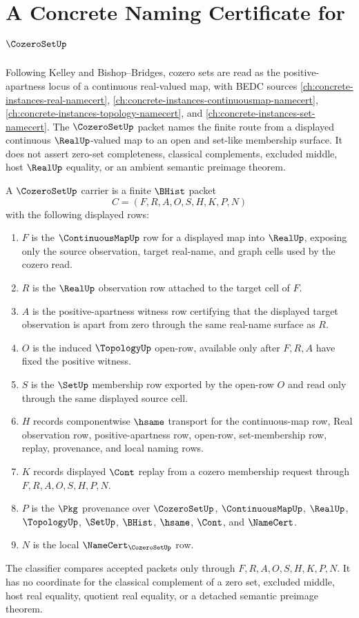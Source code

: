 \chapter{A Concrete Naming Certificate for $\CozeroSetUp$}
\label{ch:concrete-instances-cozero-set-namecert}

Following Kelley and Bishop--Bridges, cozero sets are read as the positive-apartness locus of a continuous real-valued map, with BEDC sources \autoref{ch:concrete-instances-real-namecert}, \autoref{ch:concrete-instances-continuousmap-namecert}, \autoref{ch:concrete-instances-topology-namecert}, and \autoref{ch:concrete-instances-set-namecert}. The $\CozeroSetUp$ packet names the finite route from a displayed continuous $\RealUp$-valued map to an open and set-like membership surface. It does not assert zero-set completeness, classical complements, excluded middle, host $\RealUp$ equality, or an ambient semantic preimage theorem.

\begin{definition}
\label{def:cozero-set-carrier}
A $\CozeroSetUp$ carrier is a finite $\BHist$ packet
$$
C=(F,R,A,O,S,H,K,P,N)
$$
with the following displayed rows:
\begin{enumerate}
\item $F$ is the $\ContinuousMapUp$ row for a displayed map into $\RealUp$, exposing only the source observation, target real-name, and graph cells used by the cozero read.
\item $R$ is the $\RealUp$ observation row attached to the target cell of $F$.
\item $A$ is the positive-apartness witness row certifying that the displayed target observation is apart from zero through the same real-name surface as $R$.
\item $O$ is the induced $\TopologyUp$ open-row, available only after $F,R,A$ have fixed the positive witness.
\item $S$ is the $\SetUp$ membership row exported by the open-row $O$ and read only through the same displayed source cell.
\item $H$ records componentwise $\hsame$ transport for the continuous-map row, Real observation row, positive-apartness row, open-row, set-membership row, replay, provenance, and local naming rows.
\item $K$ records displayed $\Cont$ replay from a cozero membership request through $F,R,A,O,S,H,P,N$.
\item $P$ is the $\Pkg$ provenance over $\CozeroSetUp$, $\ContinuousMapUp$, $\RealUp$, $\TopologyUp$, $\SetUp$, $\BHist$, $\hsame$, $\Cont$, and $\NameCert$.
\item $N$ is the local $\NameCert_{\CozeroSetUp}$ row.
\end{enumerate}
The classifier compares accepted packets only through $F,R,A,O,S,H,K,P,N$. It has no coordinate for the classical complement of a zero set, excluded middle, host real equality, quotient real equality, or a detached semantic preimage theorem.
\end{definition}

